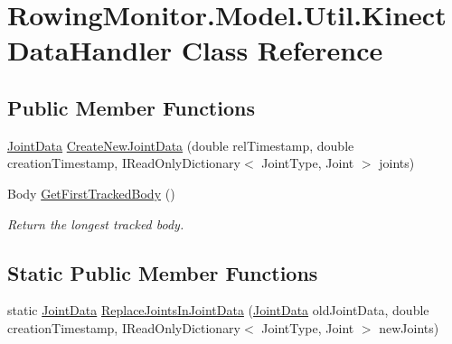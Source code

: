 \hypertarget{class_rowing_monitor_1_1_model_1_1_util_1_1_kinect_data_handler}{}\section{Rowing\+Monitor.\+Model.\+Util.\+Kinect\+Data\+Handler Class Reference}
\label{class_rowing_monitor_1_1_model_1_1_util_1_1_kinect_data_handler}
\subsection*{Public Member Functions}
\begin{DoxyCompactItemize}
\item 
\hyperlink{struct_rowing_monitor_1_1_model_1_1_util_1_1_joint_data}{Joint\+Data} \hyperlink{class_rowing_monitor_1_1_model_1_1_util_1_1_kinect_data_handler_aad695db8966d25a7c4226c369bc6be32}{Create\+New\+Joint\+Data} (double rel\+Timestamp, double creation\+Timestamp, I\+Read\+Only\+Dictionary$<$ Joint\+Type, Joint $>$ joints)
\item 
Body \hyperlink{class_rowing_monitor_1_1_model_1_1_util_1_1_kinect_data_handler_a51dce526e2a10d64012371da702ab519}{Get\+First\+Tracked\+Body} ()
\begin{DoxyCompactList}\small\item\em Return the longest tracked body. \end{DoxyCompactList}\end{DoxyCompactItemize}
\subsection*{Static Public Member Functions}
\begin{DoxyCompactItemize}
\item 
static \hyperlink{struct_rowing_monitor_1_1_model_1_1_util_1_1_joint_data}{Joint\+Data} \hyperlink{class_rowing_monitor_1_1_model_1_1_util_1_1_kinect_data_handler_aa3deffa0d869598352bff14c43dc3a7b}{Replace\+Joints\+In\+Joint\+Data} (\hyperlink{struct_rowing_monitor_1_1_model_1_1_util_1_1_joint_data}{Joint\+Data} old\+Joint\+Data, double creation\+Timestamp, I\+Read\+Only\+Dictionary$<$ Joint\+Type, Joint $>$ new\+Joints)
\end{DoxyCompactItemize}
